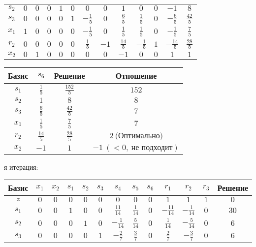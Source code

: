 \documentclass{article}%
\begin{document}
\begin{flushleft}
\begin{tabular}{|c|ccccccccccc|c|}
$s_{2}$&$0$&$0$&$0$&$1$&$0$&$0$&$0$&$1$&$0$&$0$&$-1$&$8$\\%
$s_{3}$&$0$&$0$&$0$&$0$&$1$&$-\frac{1}{5}$&$0$&$\frac{6}{5}$&$\frac{1}{5}$&$0$&$-\frac{6}{5}$&$\frac{42}{5}$\\%
$x_{1}$&$1$&$0$&$0$&$0$&$0$&$-\frac{1}{5}$&$0$&$\frac{1}{5}$&$\frac{1}{5}$&$0$&$-\frac{1}{5}$&$\frac{7}{5}$\\%
$r_{2}$&$0$&$0$&$0$&$0$&$0$&$\frac{1}{5}$&$-1$&$\frac{14}{5}$&$-\frac{1}{5}$&$1$&$-\frac{14}{5}$&$\frac{28}{5}$\\%
$x_{2}$&$0$&$1$&$0$&$0$&$0$&$0$&$0$&$-1$&$0$&$0$&$1$&$1$\\%
\hline%
\end{tabular}%
\newline%
\newline%
\newline%
\begin{tabular}{|cccc|}%
\hline%
Базис&$s_{6}$&Решение&Отношение\\%
\hline%
$s_{1}$&$\frac{1}{5}$&$\frac{152}{5}$&$152$\\%
$s_{2}$&$1$&$8$&$8$\\%
$s_{3}$&$\frac{6}{5}$&$\frac{42}{5}$&$7$\\%
$x_{1}$&$\frac{1}{5}$&$\frac{7}{5}$&$7$\\%
$r_{2}$&$\frac{14}{5}$&$\frac{28}{5}$&$2\: \text{(Оптимально)}$\\%
$x_{2}$&$-1$&$1$&$-1\: (< 0, \: \text{не подходит})$\\%
\hline%
\end{tabular}%
\newline%
\newline%
я итерация: %
\newline%
\newline%
\renewcommand{\arraystretch}{1.3}%
\begin{tabular}{|c|ccccccccccc|c|}%
\hline%
Базис&$x_{1}$&$x_{2}$&$s_{1}$&$s_{2}$&$s_{3}$&$s_{4}$&$s_{5}$&$s_{6}$&$r_{1}$&$r_{2}$&$r_{3}$&Решение\\%
\hline%
$z$&$0$&$0$&$0$&$0$&$0$&$0$&$0$&$0$&$1$&$1$&$1$&$0$\\%
\hline%
$s_{1}$&$0$&$0$&$1$&$0$&$0$&$\frac{11}{14}$&$\frac{1}{14}$&$0$&$-\frac{11}{14}$&$-\frac{1}{14}$&$0$&$30$\\%
$s_{2}$&$0$&$0$&$0$&$1$&$0$&$-\frac{1}{14}$&$\frac{5}{14}$&$0$&$\frac{1}{14}$&$-\frac{5}{14}$&$0$&$6$\\%
$s_{3}$&$0$&$0$&$0$&$0$&$1$&$-\frac{2}{7}$&$\frac{3}{7}$&$0$&$\frac{2}{7}$&$-\frac{3}{7}$&$0$&$6$\\%

\end{tabular}
\end{flushleft}
\end{document}
